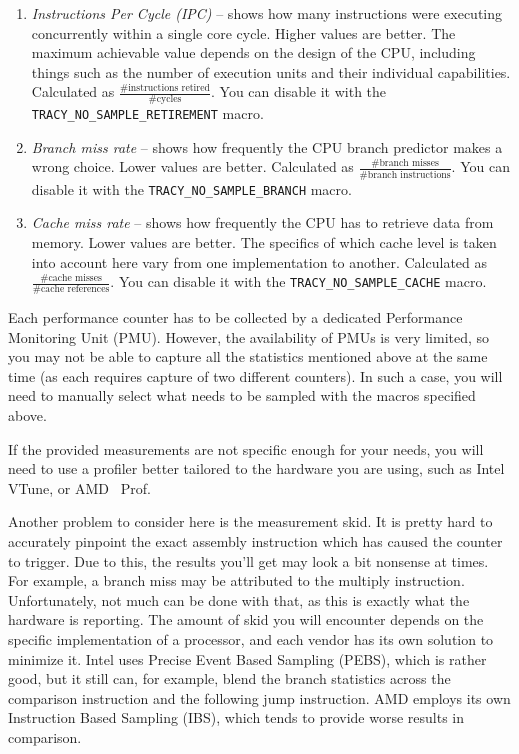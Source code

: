 \documentclass[hidelinks,titlepage,a4paper,twoside]{article}
\begin{document}
\begin{enumerate}
\item \emph{Instructions Per Cycle (IPC)} -- shows how many instructions were executing concurrently within a single core cycle. Higher values are better. The maximum achievable value depends on the design of the CPU, including things such as the number of execution units and their individual capabilities. Calculated as $\frac{\text{\#instructions retired}}{\text{\#cycles}}$. You can disable it with the \texttt{TRACY\_NO\_SAMPLE\_RETIREMENT} macro.
\item \emph{Branch miss rate} -- shows how frequently the CPU branch predictor makes a wrong choice. Lower values are better. Calculated as $\frac{\text{\#branch misses}}{\text{\#branch instructions}}$. You can disable it with the \texttt{TRACY\_NO\_SAMPLE\_BRANCH} macro.
\item \emph{Cache miss rate} -- shows how frequently the CPU has to retrieve data from memory. Lower values are better. The specifics of which cache level is taken into account here vary from one implementation to another. Calculated as $\frac{\text{\#cache misses}}{\text{\#cache references}}$. You can disable it with the \texttt{TRACY\_NO\_SAMPLE\_CACHE} macro.
\end{enumerate}

Each performance counter has to be collected by a dedicated Performance Monitoring Unit (PMU). However, the availability of PMUs is very limited, so you may not be able to capture all the statistics mentioned above at the same time (as each requires capture of two different counters). In such a case, you will need to manually select what needs to be sampled with the macros specified above.

If the provided measurements are not specific enough for your needs, you will need to use a profiler better tailored to the hardware you are using, such as Intel VTune, or AMD \si{\micro\relax}Prof.

Another problem to consider here is the measurement skid. It is pretty hard to accurately pinpoint the exact assembly instruction which has caused the counter to trigger. Due to this, the results you'll get may look a bit nonsense at times. For example, a branch miss may be attributed to the multiply instruction. Unfortunately, not much can be done with that, as this is exactly what the hardware is reporting. The amount of skid you will encounter depends on the specific implementation of a processor, and each vendor has its own solution to minimize it. Intel uses Precise Event Based Sampling (PEBS), which is rather good, but it still can, for example, blend the branch statistics across the comparison instruction and the following jump instruction. AMD employs its own Instruction Based Sampling (IBS), which tends to provide worse results in comparison.
\end{document}
